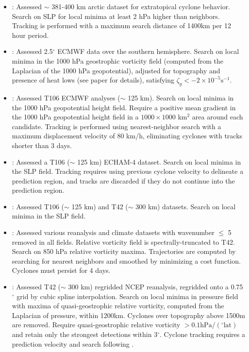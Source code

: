 \documentclass[gmdd, hvmath]{copernicus}
\begin{document}
\begin{itemize}
\item \cite{serreze1993characteristics, serreze1995climatological}:  Assessed $\sim$ 381-400 km arctic dataset for extratopical cyclone behavior.  Search on SLP for local minima at least 2 hPa higher than neighbors.  Tracking is performed with a maximum search distance of 1400km per 12 hour period.

\item \cite{sinclair1994objective, sinclair1997objective}:  Assessed 2.5$^\circ$ ECMWF data over the southern hemisphere.  Search on local minima in the 1000 hPa geostrophic vorticity field (computed from the Laplacian of the 1000 hPa geopotential), adjusted for topography and presence of heat lows (see paper for details), satisfying $\zeta_g < -2 \times 10^{-5} \mbox{s}^{-1}$.

\item \cite{blender1997identification}:  Assessed T106 ECMWF analyses ($\sim$ 125 km).  Search on local minima in the 1000 hPa geopotential height field.  Require a positive mean gradient in the 1000 hPa geopotential height field in a $1000 \times 1000$ km$^2$ area around each candidate.  Tracking is performed using nearest-neighbor search with a maximum displacement velocity of 80 km/h, eliminating cyclones with tracks shorter than 3 days.

\item \cite{lionello2002cyclones}:  Assessed a T106 ($\sim$ 125 km) ECHAM-4 dataset.  Search on local minima in the SLP field.  Tracking requires using previous cyclone velocity to delineate a prediction region, and tracks are discarded if they do not continue into the prediction region.

\item \cite{zolina2002improving}:  Assessed T106 ($\sim$ 125 km) and T42 ($\sim$ 300 km) datasets.  Search on local minima in the SLP field.

\item \cite{hoskins2002stormtracks,catto2009etcs,dacre2012atlas}: Assessed various reanalysis and climate datasets with wavenumber $\le$ 5 removed in all fields. Relative vorticity field is spectrally-truncated to T42. Search on 850 hPa relative vorticity maxima. Trajectories are computed by searching for nearest neighbors and smoothed by minimizing a cost function. Cyclones must persist for 4 days.

\item \cite{pinto2005sensitivities}:  Assessed T42 ($\sim$ 300 km) regridded NCEP reanalysis, regridded onto a 0.75$^\circ$ grid by cubic spline interpolation.  Search on local minima in pressure field with maxima of quasi-geostrophic relative vorticity, computed from the Laplacian of pressure, within 1200km.  Cyclones over topography above 1500m are removed.  Require quasi-geostrophic relative vorticity $> 0.1 \mbox{hPa} / (^\circ \mbox{lat})$ and retain only the strongest detections within 3$^\circ$.  Cyclone tracking requires a prediction velocity and search following \cite{murray1991numerical}.


\end{itemize}
\end{document}
